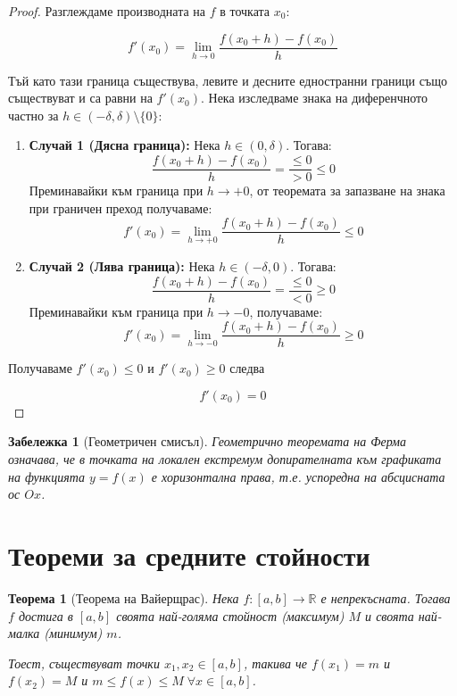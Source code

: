 \documentclass{scrartcl}
\newtheorem{theorem}{Теорема}
\newtheorem{remark}{Забележка}
\begin{document}
\begin{FlushLeft}
\begin{proof}
Разглеждаме производната на $f$ в точката $x_0$:

\[ f'(x_0) = \lim_{h \to 0} \frac{f(x_0 + h) - f(x_0)}{h} \]

Тъй като тази граница съществува, левите и десните едностранни граници също съществуват и са равни на $f'(x_0)$. Нека изследваме знака на диференчното частно за $h \in (-\delta, \delta) \setminus \{0\}$:

\begin{enumerate}
    \item \textbf{Случай 1 (Дясна граница):} Нека $h \in (0, \delta)$. Тогава:
    \[ \frac{f(x_0 + h) - f(x_0)}{h} = \frac{\le 0}{> 0} \le 0 \]
    Преминавайки към граница при $h \to +0$, от теоремата за запазване на знака при граничен преход получаваме:
    \[ f'(x_0) = \lim_{h \to +0} \frac{f(x_0 + h) - f(x_0)}{h} \le 0 \]
    
    \item \textbf{Случай 2 (Лява граница):} Нека $h \in (-\delta, 0)$. Тогава:
    \[ \frac{f(x_0 + h) - f(x_0)}{h} = \frac{\le 0}{< 0} \ge 0 \]
    Преминавайки към граница при $h \to -0$, получаваме:
    \[ f'(x_0) = \lim_{h \to -0} \frac{f(x_0 + h) - f(x_0)}{h} \ge 0 \]
\end{enumerate}

Получаваме $f'(x_0) \le 0$ и $f'(x_0) \ge 0$ следва

\[ f'(x_0) = 0 \]
\end{proof}

\begin{remark}[Геометричен смисъл]
Геометрично теоремата на Ферма означава, че в точката на локален екстремум допирателната към графиката на функцията $y = f(x)$ е хоризонтална права, т.е. успоредна на абсцисната ос $Ox$.
\end{remark}

\newpage

\section{Теореми за средните стойности}

\begin{theorem}[Теорема на Вайерщрас]
Нека $f: [a, b] \to \mathbb{R}$ е непрекъсната. Тогава $f$ достига в $[a, b]$ своята най-голяма стойност (максимум) $M$ и своята най-малка (минимум) $m$.

Тоест, съществуват точки $x_1, x_2 \in [a, b]$, такива че $f(x_1) = m$ и $f(x_2) = M$ и $m \le f(x) \le M \; \forall x \in [a, b]$.
\end{theorem}


\end{FlushLeft}
\end{document}
